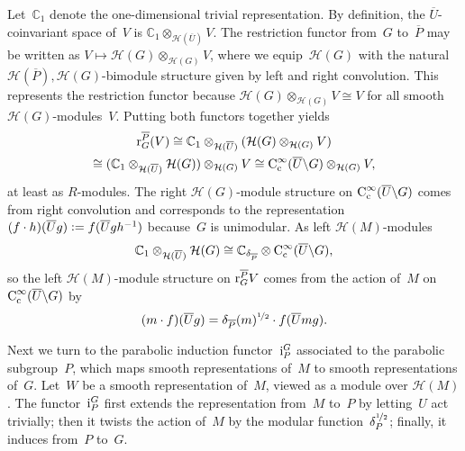 \documentclass{amsart}
\theoremstyle{remark}
\theoremstyle{definition}
\newcommand*{\Jaci}{\textup i}%
\newcommand*{\Jacr}{\textup r}%
\newcommand*{\nb}{\nobreakdash}%
\newcommand*{\defeq}{\mathrel{\vcentcolon=}}%
\newcommand*{\opp}[1]{\overline{#1}}%
\newcommand*{\C}{\mathbb C}%
\newcommand*{\Ccinf}[1][\infty]{\textup C_\textup c^{#1}}%
\newcommand{\ring}{R}%
\newcommand*{\Hecke}{\mathcal H}%
\begin{document}
Let~\(\C_1\) denote the one-dimensional trivial representation.  By definition, the \(\opp{U}\)\nb-coinvariant space of~\(V\) is \(\C_1\otimes_{\Hecke(\opp{U})} V\).  The restriction functor from~\(G\) to~\(\opp{P}\) may be written as \(V\mapsto \Hecke(G)\otimes_{\Hecke(G)} V\), where we equip~\(\Hecke(G)\) with the natural \(\Hecke(\opp{P}),\Hecke(G)\)-bimodule structure given by left and right convolution.  This represents the restriction functor because \(\Hecke(G)\otimes_{\Hecke(G)} V \cong V\) for all smooth \(\Hecke(G)\)\nb-modules~\(V\).  Putting both functors together yields
\begin{multline*}
  \Jacr_G^{\opp{P}}(V)
  \cong \C_1 \otimes_{\Hecke(\opp{U})} (\Hecke(G)\otimes_{\Hecke(G)} V)
  \\\cong (\C_1 \otimes_{\Hecke(\opp{U})} \Hecke(G))\otimes_{\Hecke(G)} V
  \cong \Ccinf(\opp{U}\backslash G)\otimes_{\Hecke(G)} V,
\end{multline*}
at least as \(\ring\)\nb-modules.  The right \(\Hecke(G)\)-module structure on \(\Ccinf(\opp{U}\backslash G)\) comes from right convolution and corresponds to the representation \((f\cdot h)(\opp{U}g) \defeq f(\opp{U}gh^{-1})\) because~\(G\) is unimodular.  As left \(\Hecke(M)\)-modules
\[
\C_1 \otimes_{\Hecke(\opp{U})} \Hecke(G) \cong
\C_{\delta_{\opp P}} \otimes \Ccinf(\opp{U}\backslash G),
\]
so the left \(\Hecke(M)\)-module structure on \(\Jacr_G^{\opp{P}} V\) comes from the action of~\(M\) on \(\Ccinf(\opp{U}\backslash G)\) by
\[
(m\cdot f) (\opp{U}g) =  \delta_{\opp{P}}(m)^{\nicefrac12} \cdot f(\opp{U}mg).
\]

Next we turn to the parabolic induction functor~\(\Jaci_P^G\) associated to the parabolic subgroup~\(P\), which maps smooth representations of~\(M\) to smooth representations of~\(G\).  Let~\(W\) be a smooth representation of~\(M\), viewed as a module over \(\Hecke(M)\).  The functor~\(\Jaci_P^G\) first extends the representation from~\(M\) to~\(P\) by letting~\(U\) act trivially; then it twists the action of~\(M\) by the modular function~\(\delta_P^{\nicefrac12}\); finally, it induces from~\(P\) to~\(G\).
\end{document}
